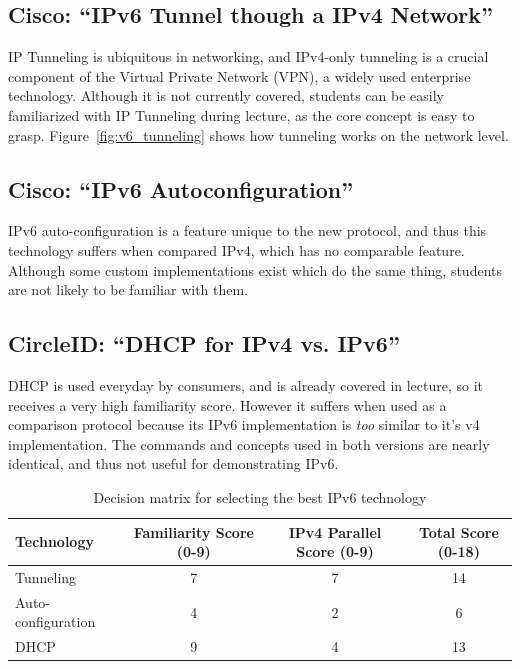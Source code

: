 \documentclass[12pt]{article}
\begin{document}
\subsection{Cisco: ``IPv6 Tunnel though a IPv4 Network''}
IP Tunneling is ubiquitous in networking, and IPv4-only tunneling is a crucial component of the Virtual Private Network (VPN), a widely used enterprise technology. Although it is not currently covered, students can be easily familiarized with IP Tunneling during lecture, as the core concept is easy to grasp. Figure~\ref{fig:v6_tunneling} shows how tunneling works on the network level.

\subsection{Cisco: ``IPv6 Autoconfiguration''}
IPv6 auto-configuration is a feature unique to the new protocol, and thus this technology suffers when compared IPv4, which has no comparable feature. Although some custom implementations exist which do the same thing, students are not likely to be familiar with them.

\subsection{CircleID: ``DHCP for IPv4 vs. IPv6''}
DHCP is used everyday by consumers, and is already covered in lecture, so it receives a very high familiarity score. However it suffers when used as a comparison protocol because its IPv6 implementation is \textit{too} similar to it's v4 implementation. The commands and concepts used in both versions are nearly identical, and thus not useful for demonstrating IPv6.

\medskip
\begin{table}[h!]
  \centering
  \label{table:dec_matrix}
  \begin{tabulary}{\textwidth}{|L|C|C|C|}
    \hline
    Technology & Familiarity Score (0-9) & IPv4 Parallel Score (0-9) & Total Score (0-18) \\ \hline\hline
    Tunneling          & 7 & 7 & 14 \\ \hline
    Auto-configuration & 4 & 2 & 6 \\ \hline
    DHCP               & 9 & 4 & 13 \\ \hline
  \end{tabulary}
  \caption{Decision matrix for selecting the best IPv6 technology}
\end{table}
\end{document}
